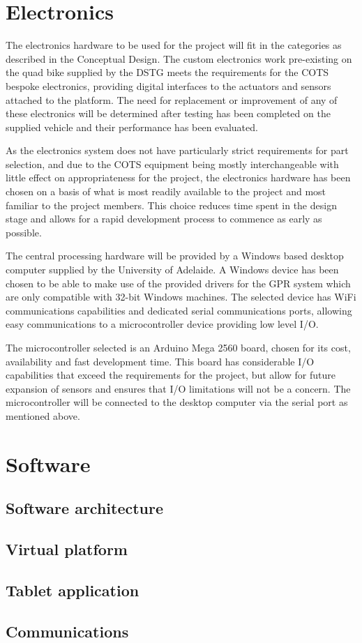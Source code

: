 \documentclass[main.tex]{subfiles}
\begin{document}
\section{Electronics}
The electronics hardware to be used for the project will fit in the categories as described in the Conceptual Design. The custom electronics work pre-existing on the quad bike supplied by the DSTG meets the requirements for the COTS bespoke electronics, providing digital interfaces to the actuators and sensors attached to the platform. The need for replacement or improvement of any of these electronics will be determined after testing has been completed on the supplied vehicle and their performance has been evaluated.

As the electronics system does not have particularly strict requirements for part selection, and due to the COTS equipment being mostly interchangeable with little effect on appropriateness for the project, the electronics hardware has been chosen on a basis of what is most readily available to the project and most familiar to the project members. This choice reduces time spent in the design stage and allows for a rapid development process to commence as early as possible.

The central processing hardware will be provided by a Windows based desktop computer supplied by the University of Adelaide. A Windows device has been chosen to be able to make use of the provided drivers for the GPR system which are only compatible with 32-bit Windows machines. The selected device has WiFi communications capabilities and dedicated serial communications ports, allowing easy communications to a microcontroller device providing low level I/O.

The microcontroller selected is an Arduino Mega 2560 board, chosen for its cost, availability and fast development time. This board has considerable I/O capabilities that exceed the requirements for the project, but allow for future expansion of sensors and ensures that I/O limitations will not be a concern. The microcontroller will be connected to the desktop computer via the serial port as mentioned above.

\section{Software}

\subsection{Software architecture}

\subsection{Virtual platform}

\subsection{Tablet application}

\subsection{Communications}
\end{document}

